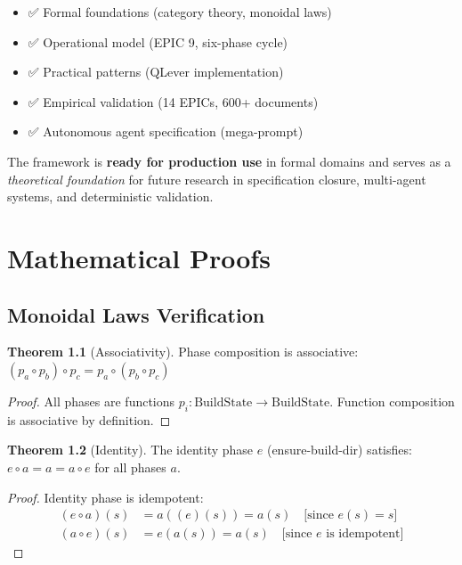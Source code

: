 \documentclass[12pt,oneside,a4paper]{book}
\theoremstyle{definition}
\newtheorem{theorem}{Theorem}[chapter]
\begin{document}
\begin{itemize}
  \item ✅ Formal foundations (category theory, monoidal laws)
  \item ✅ Operational model (EPIC 9, six-phase cycle)
  \item ✅ Practical patterns (QLever implementation)
  \item ✅ Empirical validation (14 EPICs, 600+ documents)
  \item ✅ Autonomous agent specification (mega-prompt)
\end{itemize}

The framework is \textbf{ready for production use} in formal domains and serves as a \emph{theoretical foundation} for future research in specification closure, multi-agent systems, and deterministic validation.

\appendix

\chapter{Mathematical Proofs}
\label{app:proofs}

\section{Monoidal Laws Verification}
\label{app:monoidal-proofs}

\begin{theorem}[Associativity]
Phase composition is associative: $(p_a \circ p_b) \circ p_c = p_a \circ (p_b \circ p_c)$

\begin{proof}
All phases are functions $p_i: \text{BuildState} \to \text{BuildState}$.
Function composition is associative by definition.
\end{proof}
\end{theorem}

\begin{theorem}[Identity]
The identity phase $e$ (ensure-build-dir) satisfies:
$e \circ a = a = a \circ e$ for all phases $a$.

\begin{proof}
Identity phase is idempotent:
\begin{align}
  (e \circ a)(s) &= a((e)(s)) = a(s) \quad \text{[since } e(s) = s \text{]} \\
  (a \circ e)(s) &= e(a(s)) = a(s) \quad \text{[since } e \text{ is idempotent]}
\end{align}
\end{proof}
\end{theorem}
\end{document}
